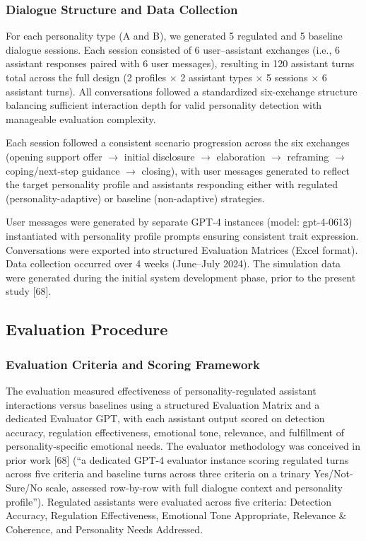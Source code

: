 \documentclass[apajournal,article,submit,moreauthors]{Definitions/mdpi}
\begin{document}
\subsubsection{Dialogue Structure and Data Collection}\label{dialogue-structure-and-data-collection}

For each personality type (A and B), we generated 5 regulated and 5 baseline dialogue sessions. Each session consisted of 6 user--assistant exchanges (i.e., 6 assistant responses paired with 6 user messages), resulting in 120 assistant turns total across the full design (2 profiles $\times$ 2 assistant types $\times$ 5 sessions $\times$ 6 assistant turns). All conversations followed a standardized six-exchange structure balancing sufficient interaction depth for valid personality detection with manageable evaluation complexity.

Each session followed a consistent scenario progression across the six exchanges (opening support offer $\rightarrow$ initial disclosure $\rightarrow$ elaboration $\rightarrow$ reframing $\rightarrow$ coping/next-step guidance $\rightarrow$ closing), with user messages generated to reflect the target personality profile and assistants responding either with regulated (personality-adaptive) or baseline (non-adaptive) strategies.

User messages were generated by separate GPT-4 instances (model: gpt-4-0613) instantiated with personality profile prompts ensuring consistent trait expression. Conversations were exported into structured Evaluation Matrices (Excel format). Data collection occurred over 4 weeks (June--July 2024). The simulation data were generated during the initial system development phase, prior to the present study {[}68{]}.

\subsection{Evaluation Procedure}\label{evaluation-procedure}

\subsubsection{Evaluation Criteria and Scoring Framework}\label{evaluation-criteria-and-scoring-framework}

The evaluation measured effectiveness of personality-regulated assistant interactions versus baselines using a structured Evaluation Matrix and a dedicated Evaluator GPT, with each assistant output scored on detection accuracy, regulation effectiveness, emotional tone, relevance, and fulfillment of personality-specific emotional needs. The evaluator methodology was conceived in prior work {[}68{]} (``a dedicated GPT-4 evaluator instance scoring regulated turns across five criteria and baseline turns across three criteria on a trinary Yes/Not-Sure/No scale, assessed row-by-row with full dialogue context and personality profile''). Regulated assistants were evaluated across five criteria: Detection Accuracy, Regulation Effectiveness, Emotional Tone Appropriate, Relevance \& Coherence, and Personality Needs Addressed.
\end{document}
